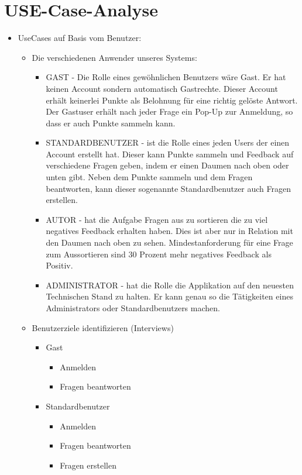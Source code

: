 \section{USE-Case-Analyse}
\begin{itemize}
	\item UseCases auf Basis vom Benutzer: 
	\begin{itemize}
		\item Die verschiedenen Anwender unseres Systems:
			\begin{itemize}
				\item GAST - Die Rolle eines gewöhnlichen Benutzers wäre Gast. Er hat keinen Account sondern automatisch Gastrechte. Dieser Account erhält keinerlei Punkte als Belohnung für eine richtig gelöste Antwort. Der Gastuser erhält nach jeder Frage ein Pop-Up zur Anmeldung, so dass er auch Punkte sammeln kann. 
				\item STANDARDBENUTZER - ist die Rolle eines jeden Users der einen Account erstellt hat. Dieser kann Punkte sammeln und Feedback auf verschiedene Fragen geben, indem er einen Daumen nach oben oder unten gibt. Neben dem Punkte sammeln und dem Fragen beantworten, kann dieser sogenannte Standardbenutzer auch Fragen erstellen.
				\item AUTOR - hat die Aufgabe Fragen aus zu sortieren die zu viel negatives Feedback erhalten haben. Dies ist aber nur in Relation mit den Daumen nach oben zu sehen. Mindestanforderung für eine Frage zum Aussortieren sind 30 Prozent mehr negatives Feedback als Positiv. 
				\item ADMINISTRATOR - hat die Rolle die Applikation auf den neuesten Technischen Stand zu halten. Er kann genau so die Tätigkeiten eines Administrators oder Standardbenutzers machen. 
			\end{itemize} 
		\item Benutzerziele identifizieren (Interviews)
			\begin{itemize}
				\item Gast
					\begin{itemize}
						\item Anmelden
						\item Fragen beantworten
					\end{itemize}
				\item Standardbenutzer
					\begin{itemize}
						\item Anmelden
						\item Fragen beantworten
						\item Fragen erstellen

\end{itemize}
\end{itemize}
\end{itemize}
\end{itemize}
